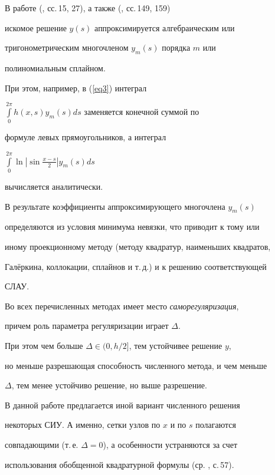 \begin{alg}


В работе (\cite{gab}, сс.\,15, 27), а также (\cite{iv1}, сс.\,149, 159)


искомое решение $y(s)$ аппроксимируется алгебраическим или


тригонометрическим многочленом $y_m(s)$ порядка $m$ или


полиномиальным сплайном.


При этом, например, в (\ref{eq3}) интеграл


$\int\limits_0^{2\pi}h(x,s)y_m(s)ds$ заменяется конечной суммой по


формуле левых прямоугольников, а интеграл


$\int\limits_0^{2\pi}\ln|\sin\frac{x-s}2|y_m(s)ds$


вычисляется аналитически.


В результате коэффициенты аппроксимирующего многочлена $y_m(s)$


определяются из условия минимума невязки, что приводит к тому или


иному проекционному методу (методу квадратур, наименьших квадратов,


Гал\"еркина, коллокации, сплайнов и т.\,д.) и к решению соответствующей


СЛАУ. 


\end{alg}





Во всех перечисленных методах имеет место {\it саморегуляризация},


причем роль параметра регуляризации играет $\Delta$.


При этом чем больше $\Delta\in(0,h/2]$, тем устойчивее решение $y$,


но меньше разрешающая способность численного метода, и чем меньше


$\Delta$, тем менее устойчиво решение, но выше разрешение. 





В данной работе предлагается иной вариант численного решения


некоторых СИУ. А именно, сетки узлов по $x$ и по $s$ полагаются


совпадающими (т.\,е. $\Delta=0$), а особенности устраняются за счет


использования обобщенной квадратурной формулы (ср. \cite{ksh}, с.\,57).


